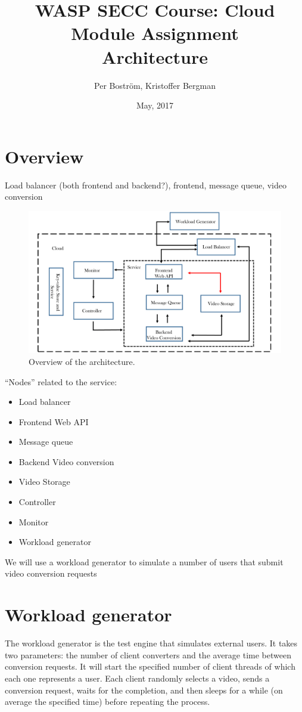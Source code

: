 \documentclass[a4paper, 10pt, english]{article}
\title{WASP SECC Course: Cloud Module Assignment\\Architecture}
\author{Per Boström, Kristoffer Bergman}
\date{May, 2017}
\begin{document}
\maketitle

\section{Overview}

Load balancer (both frontend and backend?), frontend, message queue, video conversion

\begin{figure}
	\label{fig:architecture}
	\centering
	\includegraphics[width=1\textwidth]{figs/workflow.pdf}
	\caption{Overview of the architecture.}
\end{figure}

``Nodes'' related to the service:
\begin{itemize}
\item Load balancer
\item Frontend Web API
\item Message queue
\item Backend Video conversion
\item Video Storage
\item Controller
\item Monitor
\item Workload generator

\end{itemize}

We will use a workload generator to simulate a number of users that submit video conversion requests

\section{Workload generator}
The workload generator is the test engine that simulates external users. It takes two parameters: the number of client converters and the average time between conversion requests. It will start the specified number of client threads of which each one represents a user. Each client randomly selects a video, sends a conversion request, waits for the completion, and then sleeps for a while (on average the specified time) before repeating the process.
\end{document}
